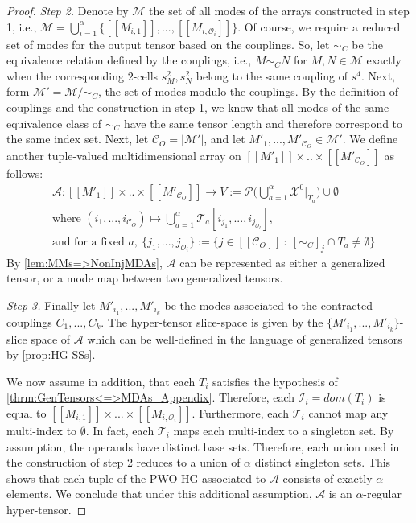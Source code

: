 \documentclass{article}
\theoremstyle{plain}
\theoremstyle{definition}
\theoremstyle{remark}
\newcommand{\cX}{\mathcal{X}}
\newcommand{\cC}{\mathcal{C}}
\newcommand{\cO}{\mathcal{O}}
\newcommand{\cP}{\mathcal{P}}
\newcommand{\cI}{\mathcal{I}}
\newcommand{\cA}{\mathcal{A}}
\newcommand{\cM}{\mathcal{M}}
\newcommand{\cT}{\mathcal{T}}
\begin{document}
\begin{proof}
	\textit{Step 2.} Denote by $\cM$ the set of all modes of the arrays constructed in step 1, i.e., $\cM = \bigcup_{i = 1}^{\alpha}\{ [[M_{i,1}]], ..., [[M_{i,\cO_i}]]\}$. Of course, we require a reduced set of modes for the output tensor based on the couplings. So, let $\sim_C$ be the equivalence relation defined by the couplings, i.e., $M \sim_C N$ for $M, N \in \cM$ exactly when the corresponding $2$-cells $s^2_M, s^2_N$ belong to the same coupling of $s^4$. Next, form $\cM' = \cM / \sim_C$, the set of modes modulo the couplings. By the definition of couplings and the construction in step 1, we know that all modes of the same equivalence class of $\sim_C$ have the same tensor length and therefore correspond to the same index set. Next, let $\cC_{O} = |\cM'|$, and let $M'_1, ..., M'_{\cC_O} \in \cM'$. We define another tuple-valued multidimensional array on $[[M'_1]]  \times .. \times [[M'_{\cC_O}]]$ as follows:
	\begin{equation*}
		\begin{aligned}
			&\cA: [[M'_1]]  \times .. \times [[M'_{\cC_O}]] \rightarrow V := \cP\bigg(\bigcup_{a = 1}^{\alpha}\cX^0|_{T_a}\bigg) \cup \emptyset\\
			&\text{where }(i_1, ..., i_{\cC_O}) \mapsto \bigcup_{a = 1}^{\alpha} \cT_a[i_{j_1}, ..., i_{j_{\cO_l}}],\\
			&\text{and for a fixed } a, \ \{j_1, ..., j_{\cO_i}\} := \big\{j \in [[\cC_O]] \ : \ [\sim_C]_j \cap T_a \neq \emptyset \big\}
		\end{aligned}
	\end{equation*}
	By \cref{lem:MMs=>NonInjMDAs}, $\cA$ can be represented as either a generalized tensor, or a mode map between two generalized tensors.
	
	\textit{Step 3.} Finally let $M'_{i_1}, ..., M'_{i_k}$ be the modes associated to the contracted couplings $C_1, ..., C_k$. The hyper-tensor slice-space is given by the $\{M'_{i_1}, ..., M'_{i_k}\}$-slice space of $\cA$ which can be well-defined in the language of generalized tensors by \cref{prop:HG-SSs}.
	
	We now assume in addition, that each $T_i$ satisfies the hypothesis of \cref{thrm:GenTensors<=>MDAs_Appendix}. Therefore, each $\cI_i = dom(T_i)$ is equal to $[[M_{i,1}]] \times ... \times [[M_{i,\cO_i}]]$. Furthermore, each $\cT_i$ cannot map any multi-index to $\emptyset$. In fact, each $\cT_i$ maps each multi-index to a singleton set. By assumption, the operands have distinct base sets. Therefore, each union used in the construction of step 2 reduces to a union of $\alpha$ distinct singleton sets. This shows that each tuple of the PWO-HG associated to $\cA$ consists of exactly $\alpha$ elements. We conclude that under this additional assumption, $\cA$ is an $\alpha$-regular hyper-tensor.
	

\end{proof}
\end{document}
